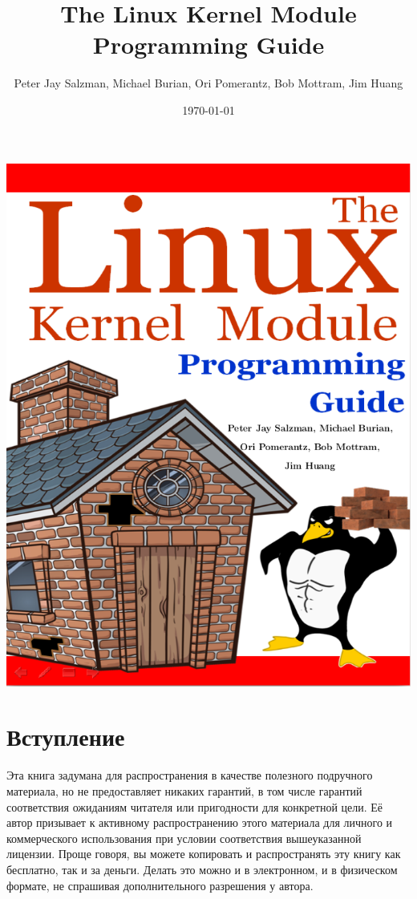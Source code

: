 \documentclass[10pt, oneside]{book}
\author{Peter Jay Salzman, Michael Burian, Ori Pomerantz, Bob Mottram, Jim Huang}
\date{\today}
\title{The Linux Kernel Module Programming Guide}
\begin{document}
\maketitle
\ifdefined\HCode
\includegraphics{assets/cover-with-names.png}
\else
\pagestyle{empty}
\tableofcontents
\fi

\section{Вступление}
\label{sec:introduction}
Эта книга задумана для распространения в качестве полезного подручного материала, но не предоставляет никаких гарантий, в том числе гарантий
соответствия ожиданиям читателя или пригодности для конкретной цели. Её автор призывает к активному распространению этого материала для личного и
коммерческого использования при условии соответствия вышеуказанной лицензии. Проще говоря, вы можете копировать и распространять эту книгу как бесплатно, так и за деньги. Делать это можно и в электронном, и в физическом формате, не спрашивая дополнительного разрешения у автора.
\end{document}
